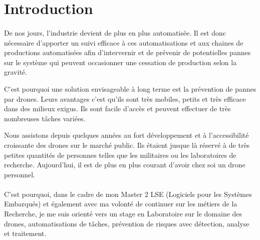 \setcounter{page}{1}
\section{Introduction}
    \paragraph*{}
    De nos jours, l'industrie devient de plus en plus automatisée. Il est donc nécessaire d'apporter un suivi efficace à ces automatisations et aux chaines de productions automatisées afin d'intervernir et de prévenir de potentielles pannes sur le système qui peuvent occasionner une cessation de production selon la gravité.
    	
    C'est pourquoi une solution envisageable à long terme est la prévention de pannes par drones. Leurs avantages c'est qu'ils sont très mobiles, petits et très efficace dans des milieux exigus. Ils sont facile d'accès et peuvent effectuer de très nombreuses tâches variées.
    
    Nous assistons depuis quelques années au fort développement et à l'accessibilité croissante des drones sur le marché public. Ils étaient jusque là réservé à de très petites quantités de personnes telles que les militaires ou les laboratoires de recherche. Aujourd'hui, il est de plus en plus courant d'avoir chez soi un drone personnel.
    
    \paragraph*{}
    C'est pourquoi, dans le cadre de mon Master 2 LSE (Logiciels pour les Systèmes Embarqués) et également avec ma volonté de continuer sur les métiers de la Recherche, je me suis orienté vers un stage en Laboratoire sur le domaine des drones, automatisations de tâches, prévention de risques avec détection, analyse et traitement.